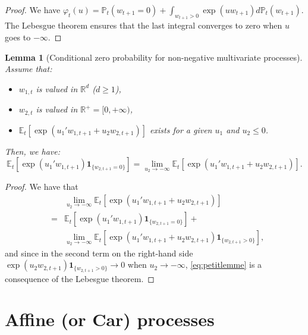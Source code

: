 \documentclass[
  12pt,
]{book}
\providecommand{\tightlist}{%
  \setlength{\itemsep}{0pt}\setlength{\parskip}{0pt}}
\newtheorem{lemma}{Lemma}[chapter]
\theoremstyle{definition}
\theoremstyle{definition}
\theoremstyle{definition}
\theoremstyle{definition}
\theoremstyle{remark}
\begin{document}
\begin{proof}
We have \(\varphi_t(u) = \mathbb{P}_t(w_{t+1} = 0) + \int_{w_{t+1}> 0} \exp(u w_{t+1}) d\mathbb{P}_t(w_{t+1})\). The Lebesgue theorem ensures that the last integral converges to zero when \(u\) goes to \(-\infty\).
\end{proof}

\begin{lemma}[Conditional zero probability for non-negative multivariate processes]
\protect\hypertarget{lem:lemPetitLemme}{}\label{lem:lemPetitLemme}Assume that:

\begin{itemize}
\tightlist
\item
  \(w_{1,t}\) is valued in \(\mathbb{R}^{d}\) (\(d \geq 1\)),
\item
  \(w_{2,t}\) is valued in \(\mathbb{R}^+ = [0, + \infty )\),
\item
  \(\mathbb{E}_t \left[ \exp \left( u_1 ' w_{1,t+1} + u_2 w_{2,t+1} \right) \right]\) exists for a given \(u_1\) and \(u_2 \leq 0\).
\end{itemize}

Then, we have:
\begin{equation}
\mathbb{E}_t \left[ \exp( u_1 ' w_{1,t+1})  \textbf{1}_{\{w_{2,t+1} = 0 \}} \right] =  \underset{u_2 \rightarrow -\infty}{\lim} \mathbb{E}_t \left[ \exp( u_1 ' w_{1,t+1} + u_2   w_{2,t+1} )  \right].\label{eq:petitlemme}
\end{equation}
\end{lemma}

\begin{proof}
We have that
\begin{eqnarray*}
&&\underset{u_2 \rightarrow -\infty}{\lim} \mathbb{E}_t \left[ \exp( u_1 ' w_{1,t+1} + u_2   w_{2,t+1} )  \right] \\
&=& \mathbb{E}_t \left[ \exp( u_1 ' w_{1,t+1})   \textbf{1}_{\{w_{2,t+1} = 0 \}} \right] +\\
&& \underset{u_2 \rightarrow -\infty}{\lim}   \mathbb{E}_t \left[ \exp( u_1 ' w_{1,t+1} + u_2   w_{2,t+1} )  \textbf{1}_{\{w_{2,t+1} > 0 \}}  \right] ,
\end{eqnarray*}
and since in the second term on the right-hand side \(\exp(u_2 w_{2,t+1}) \textbf{1}_{\{w_{2,t+1} > 0 \}} \rightarrow 0\) when \(u_2 \rightarrow -\infty\), \eqref{eq:petitlemme} is a consequence of the Lebesgue theorem.
\end{proof}

\hypertarget{AffineCar}{%
\section{Affine (or Car) processes}\label{AffineCar}}
\end{document}
